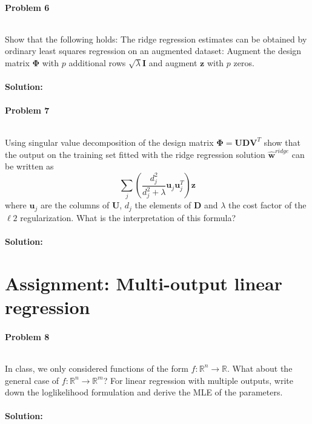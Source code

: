 \documentclass{article}
\renewcommand{\Vec}[1]{\ensuremath{\mathbf{#1}}}
\newcommand{\Mtx}[1]{\ensuremath{\mathbf{#1}}}
\newcommand{\R}{\ensuremath{\mathbb{R}}}
\begin{document}
\paragraph*{Problem 6}
$\;$ 

Show that the following holds:
The ridge regression estimates can be obtained by ordinary
least squares regression on an augmented dataset: Augment the
design matrix $\Mtx{\Phi}$ with $p$ additional rows  $\sqrt{\lambda}\Mtx{I}$
and augment $\Vec{z}$ with $p$ zeros.

\paragraph*{Solution:}




\paragraph*{Problem 7}
$\;$ 

Using singular value decomposition of the design matrix $\Mtx{\Phi} =
\Mtx{U}\Mtx{D}\Mtx{V}^T$ show that the output on the training set fitted with
the ridge regression solution $\hat{\Vec{w}}^{ridge}$ can be written as 
\[
\sum_j \left( \frac{d_j^2}{d_j^2 + \lambda} \Vec{u}_j \Vec{u}_j^T \right) \Vec{z} 
\]
where $\Vec{u}_j$ are the columns of $\Mtx{U}$, $d_j$ the
elements of $\Mtx{D}$ and $\lambda$ the cost factor of the $\ell2$
regularization. What is the interpretation of this formula?

\paragraph*{Solution:}




\section{Assignment: Multi-output linear regression }
\paragraph*{Problem 8}
$\;$ 

In class, we only considered functions of the form $f: \R^n \rightarrow \R$. What
about the general case of $f: \R^n \rightarrow \R^m$? For linear regression with
multiple outputs, write down the loglikelihood formulation and derive the MLE of
the parameters.

\paragraph*{Solution:}
\end{document}
